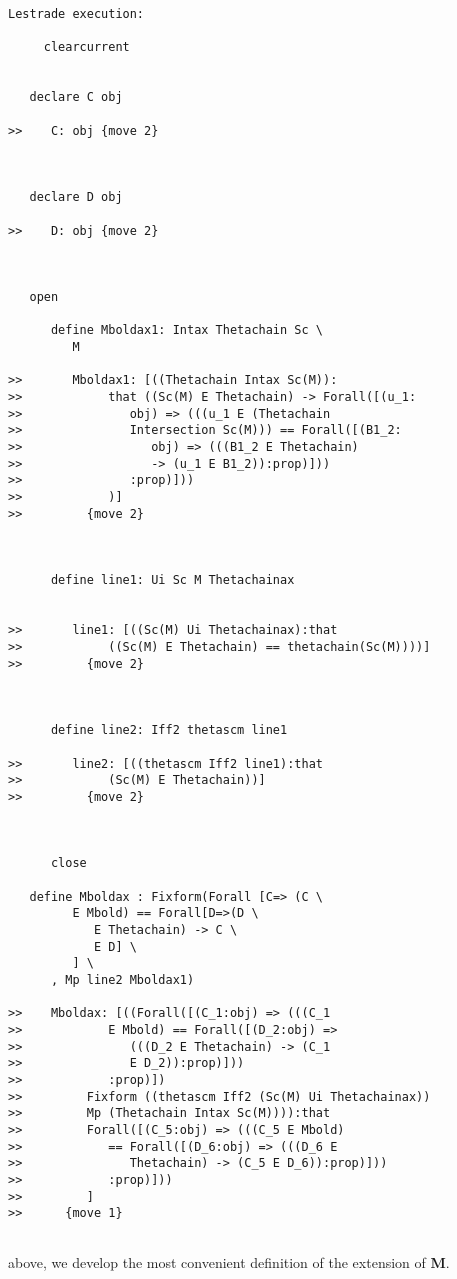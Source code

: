 \documentclass[12pt]{article}
\begin{document}
\begin{verbatim}Lestrade execution:

     clearcurrent


   declare C obj

>>    C: obj {move 2}



   declare D obj

>>    D: obj {move 2}



   open

      define Mboldax1: Intax Thetachain Sc \
         M

>>       Mboldax1: [((Thetachain Intax Sc(M)):
>>            that ((Sc(M) E Thetachain) -> Forall([(u_1:
>>               obj) => (((u_1 E (Thetachain
>>               Intersection Sc(M))) == Forall([(B1_2:
>>                  obj) => (((B1_2 E Thetachain)
>>                  -> (u_1 E B1_2)):prop)]))
>>               :prop)]))
>>            )]
>>         {move 2}



      define line1: Ui Sc M Thetachainax


>>       line1: [((Sc(M) Ui Thetachainax):that
>>            ((Sc(M) E Thetachain) == thetachain(Sc(M))))]
>>         {move 2}



      define line2: Iff2 thetascm line1

>>       line2: [((thetascm Iff2 line1):that
>>            (Sc(M) E Thetachain))]
>>         {move 2}



      close

   define Mboldax : Fixform(Forall [C=> (C \
         E Mbold) == Forall[D=>(D \
            E Thetachain) -> C \
            E D] \
         ] \
      , Mp line2 Mboldax1)

>>    Mboldax: [((Forall([(C_1:obj) => (((C_1
>>            E Mbold) == Forall([(D_2:obj) =>
>>               (((D_2 E Thetachain) -> (C_1
>>               E D_2)):prop)]))
>>            :prop)])
>>         Fixform ((thetascm Iff2 (Sc(M) Ui Thetachainax))
>>         Mp (Thetachain Intax Sc(M)))):that
>>         Forall([(C_5:obj) => (((C_5 E Mbold)
>>            == Forall([(D_6:obj) => (((D_6 E
>>               Thetachain) -> (C_5 E D_6)):prop)]))
>>            :prop)]))
>>         ]
>>      {move 1}


\end{verbatim}

above, we develop the most convenient definition of the extension of {\bf M}.
\end{document}
